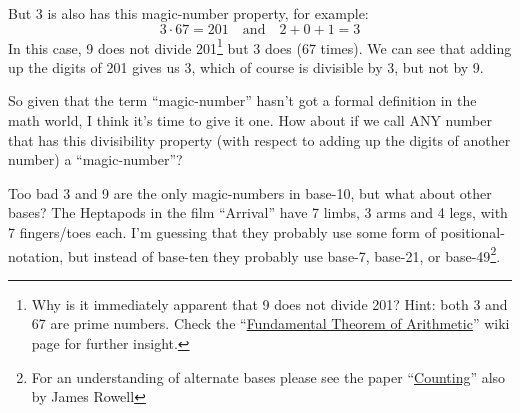 \documentclass{article}
\begin{document}
But 3 is also has this magic-number property, for example:
\[ 3\cdot{}67=201 \quad\text{and}\quad 2+0+1=3\]
In this case, 9 does not divide 201\footnote{Why is it immediately
apparent that 9 does not divide 201? Hint: both 3 and 67 are prime numbers.
Check the ``\href{https://en.wikipedia.org/wiki/Fundamental_theorem_of_arithmetic}{Fundamental
Theorem of Arithmetic}'' wiki page for further insight.}
but 3 does (67 times).
We can see that adding up the digits of 201 gives us 3,
which of course is divisible by 3, but not by 9.

So given that the term ``magic-number'' hasn't got
a formal definition in the math world, I think it's time to give it one.
How about if we call ANY number that has this
divisibility property (with respect to adding up the digits of another number) a ``magic-number''?

Too bad 3 and 9 are the only magic-numbers in base-10,
but what about other bases?
The Heptapods in the film ``Arrival'' have 7 limbs, 3 arms and 4 legs, with 7 fingers/toes each.
I'm guessing that they probably use some form of positional-notation,
but instead of base-ten they probably use base-7, base-21,
or base-49\footnote{For an understanding of alternate bases please see
the paper ``\href {https://www.dropbox.com/s/bwmrffmkcidnf27/basisReprThm.pdf?dl=0}
{Counting}'' also by James Rowell}.
\end{document}
